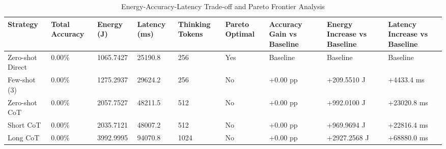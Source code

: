 \begin{table}
\caption{Energy-Accuracy-Latency Trade-off and Pareto Frontier Analysis}
\label{tab:tradeoff_comparison}
\begin{tabular}{lllllllll}
\toprule
Strategy & Total Accuracy & Energy (J) & Latency (ms) & Thinking Tokens & Pareto Optimal & Accuracy Gain vs Baseline & Energy Increase vs Baseline & Latency Increase vs Baseline \\
\midrule
Zero-shot Direct & 0.00\% & 1065.7427 & 25190.8 & 256 & Yes & Baseline & Baseline & Baseline \\
Few-shot (3) & 0.00\% & 1275.2937 & 29624.2 & 256 & No & +0.00 pp & +209.5510 J & +4433.4 ms \\
Zero-shot CoT & 0.00\% & 2057.7527 & 48211.5 & 512 & No & +0.00 pp & +992.0100 J & +23020.8 ms \\
Short CoT & 0.00\% & 2035.7121 & 48007.2 & 512 & No & +0.00 pp & +969.9694 J & +22816.4 ms \\
Long CoT & 0.00\% & 3992.9995 & 94070.8 & 1024 & No & +0.00 pp & +2927.2568 J & +68880.0 ms \\
\bottomrule
\end{tabular}
\end{table}
